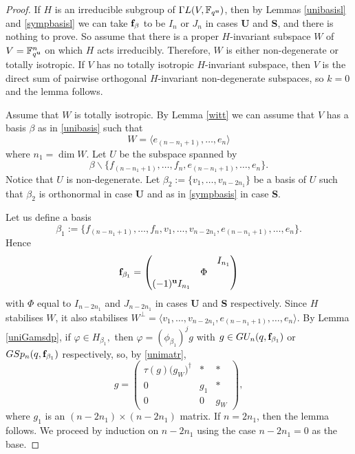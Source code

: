 \begin{proof}
If $H$ is an irreducible subgroup of ${{\Gamma L}}(V,\mathbb{F}_{q^{\bf u}})$, then by Lemmas \ref{unibasisl} and \ref{sympbasisl} we can take ${\bf f}_{\beta}$ to be $I_n$ or $J_n$ in cases {\bf U} and {\bf S}, and there is nothing  to prove. So assume that there is a proper $H$-invariant subspace $W$ of $V=\mathbb{F}_{q^{\bf u}}^n$ on which $H$ acts irreducibly. Therefore, $W$ is either non-degenerate or totally isotropic. If $V$ has no totally isotropic $H$-invariant subspace, then $V$ is the direct sum of pairwise orthogonal $H$-invariant  non-degenerate subspaces, so $k=0$ and the lemma follows.

Assume that $W$ is totally isotropic.  By Lemma \ref{witt} we can assume that $V$ has a basis $\beta$ as in \eqref{unibasis} such that $$W= \langle e_{(n-n_1+1)}, \ldots, e_{n} \rangle$$
where $n_1=\dim W$. %
Let $U$ be the subspace spanned by 
$$\beta \backslash \{f_{(n-n_1+1)}, \ldots, f_{n}, e_{(n-n_1+1)}, \ldots, e_{n}\}.$$ Notice that $U$ is non-degenerate. Let $\beta_2:=\{v_1, \ldots, v_{n-2n_1}\}$ be a basis of $U$ such that $\beta_2$ is orthonormal in case {\bf U} and as in \eqref{sympbasis} in case {\bf S}. 

Let us define a basis  $$\beta_1:=\{f_{(n-n_1+1)}, \ldots, f_{n}, v_1, \ldots, v_{n-2n_1},   e_{(n-n_1+1)}, \ldots, e_{n}\}.$$%
Hence
 \begin{equation*}
{\bf f}_{\beta_1}=
\begin{pmatrix}
  & & I_{n_1}\\
  &\Phi&\\
(-1)^{\bf u}I_{n_1} & &
\end{pmatrix}
\end{equation*} 
with $\Phi$ equal to $I_{n-2n_1}$ and $J_{n-2n_1}$ in cases {\bf U} and {\bf S} respectively. Since $H$ stabilises $W$, it also stabilises $W^{\bot}=\langle v_1, \ldots, v_{n-2n_1},   e_{(n-n_1+1)}, \ldots, e_{n} \rangle$.  By Lemma \ref{uniGamsdp}, if $\varphi \in H_{\beta_1},$ then $\varphi= (\phi_{\beta_1})^j g$ with $g \in GU_n(q, {\bf f}_{\beta_1})$ or $GSp_n(q,{\bf f}_{\beta_1})$ respectively, so, by \eqref{unimatr},   
\begin{equation*}
g=
\begin{pmatrix}
{\tau(g){(g_W})^{\dagger}}&* &*   \\
   0     & g_1 &* \\
0        &0 & g_W    
\end{pmatrix},
\end{equation*}
where $g_1$ is an $(n-2n_1) \times (n-2n_1)$ matrix. If $n=2n_1$, then the lemma follows. We proceed by induction on $n-2n_1$ using the case $n-2n_1=0$ as the base. 


\end{proof}
